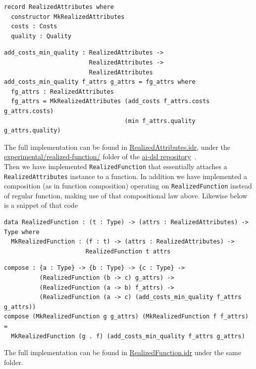 \documentclass[]{report}
\begin{document}
\begin{verbatim}
record RealizedAttributes where
  constructor MkRealizedAttributes
  costs : Costs
  quality : Quality
\end{verbatim}

\begin{verbatim}
add_costs_min_quality : RealizedAttributes ->
                        RealizedAttributes ->
                        RealizedAttributes
add_costs_min_quality f_attrs g_attrs = fg_attrs where
  fg_attrs : RealizedAttributes
  fg_attrs = MkRealizedAttributes (add_costs f_attrs.costs g_attrs.costs)
                                  (min f_attrs.quality g_attrs.quality)
\end{verbatim}
The full implementation can be found in
\href{https://github.com/singnet/ai-dsl/blob/master/experimental/realized-function/RealizedAttributes.idr}{RealizedAttributes.idr},
under the
\href{https://github.com/singnet/ai-dsl/blob/master/experimental/realized-function/}{experimental/realized-function/}
folder of the \href{https://github.com/singnet/ai-dsl/}{ai-dsl
  repository}~\cite{AIDSLRepo}.\\

Then we have implemented \texttt{RealizedFunction} that essentially
attaches a \texttt{RealizedAttributes} instance to a function.  In
addition we have implemented a composition (as in function
composition) operating on \texttt{RealizedFunction} instead of
regular function, making use of that compositional law above.
Likewise below is a snippet of that code

\begin{verbatim}
data RealizedFunction : (t : Type) -> (attrs : RealizedAttributes) -> Type where
  MkRealizedFunction : (f : t) -> (attrs : RealizedAttributes) ->
                       RealizedFunction t attrs
\end{verbatim}

\begin{verbatim}
compose : {a : Type} -> {b : Type} -> {c : Type} ->
          (RealizedFunction (b -> c) g_attrs) ->
          (RealizedFunction (a -> b) f_attrs) ->
          (RealizedFunction (a -> c) (add_costs_min_quality f_attrs g_attrs))
compose (MkRealizedFunction g g_attrs) (MkRealizedFunction f f_attrs) =
  MkRealizedFunction (g . f) (add_costs_min_quality f_attrs g_attrs)
\end{verbatim}
The full implementation can be found in
\href{https://github.com/singnet/ai-dsl/blob/master/experimental/realized-function/RealizedFunction.idr}{RealizedFunction.idr}
under the same folder.
\end{document}
